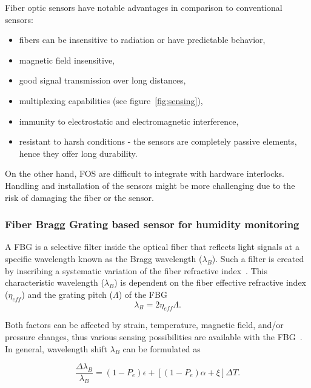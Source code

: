 Fiber optic sensors have notable advantages in comparison to conventional sensors:

\begin{itemize}
    \item fibers can be insensitive to radiation or have predictable behavior,
    \item magnetic field insensitive,
    \item good signal transmission over long distances,
    \item multiplexing capabilities (see figure~\ref{fig:sensing}),
    \item immunity to electrostatic and electromagnetic interference,
    \item resistant to harsh conditions - the sensors are completely passive elements, hence they offer long durability.
\end{itemize}

On the other hand, \gls{FOS} are difficult to integrate with hardware interlocks. Handling and installation of the sensors might be more challenging due to the risk of damaging the fiber or the sensor. 




\subsubsection{Fiber Bragg Grating based sensor for humidity monitoring }
\label{fbg}
A FBG is a selective filter inside the optical fiber that reflects light signals at a specific wavelength known as the Bragg wavelength ($\lambda_{B}$). Such a filter is created by inscribing a systematic variation of the fiber refractive index~\cite{fbg_overview}. This characteristic wavelength ($\lambda_{B}$) is dependent on the fiber effective refractive index ($\eta_{eff}$) and the grating pitch ($\Lambda$) of the \gls{FBG}~\cite{Othonos2000FiberBG}
\begin{equation}
    \lambda_{B} = 2 \eta_{eff} \Lambda.
\end{equation}

Both factors can be affected by strain, temperature, magnetic field, and/or pressure changes, thus various sensing possibilities are available with the FBG~\cite{Yun-Jiang_Rao_1997}. In general, wavelength shift $\lambda_{B}$ can be formulated as

\begin{equation}
    \frac{\Delta\lambda_{B}}{\lambda_{B}}=(1-P_{e}) \epsilon + \left [(1-P_{e}) \alpha + \xi  \right ] \Delta T.
\end{equation}

